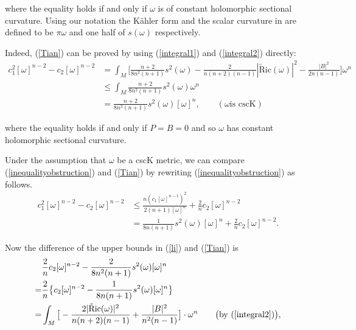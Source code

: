 \documentclass[11pt]{amsart}
\theoremstyle{definition}
\theoremstyle{remark}
\numberwithin{equation}{section}
\begin{document}
where the equality holds if and only if $\omega$ is of constant
holomorphic sectional curvature. Using our notation the K\"{a}hler
form and the scalar curvature in \cite{Ti} are defined to be
$\pi\omega$ and one half of $s(\omega)$ respectively.

Indeed, (\ref{Tian}) can be proved by using (\ref{integral1}) and
(\ref{integral2}) directly:
\begin{equation}\begin{split}
c_1^2[\omega]^{n-2}-c_2[\omega]^{n-2}&=\int_M\big[\frac{n+2}
{8n^2(n+1)}s^2(\omega)-\frac{2 }{n(n+2)(n-1)}|\tilde{\text{R}}
\text{ic}(\omega)|^2-\frac{|B|^2}{2n(n-1)}\big]\omega^n\\
&\leq\int_M\frac{n+2}
{8n^2(n+1)}s^2(\omega)\omega^n\\
&=\frac{n+2}{8n^2(n+1)}s^2(\omega)[\omega]^n,\qquad(\text{$\omega$
is cscK})\end{split}\nonumber\end{equation}

where the equality holds if and only if $P=B=0$ and so $\omega$ has
constant holomorphic sectional curvature.

Under the assumption that $\omega$ be a cscK metric, we can compare
(\ref{inequalityobstruction}) and (\ref{Tian}) by rewriting
(\ref{inequalityobstruction}) as follows. \begin{equation}\label{li}\begin{split}
c_1^2[\omega]^{n-2}-c_2[\omega]^{n-2}&\leq\frac{n(c_1[\omega]^{n-1})^2}
{2(n+1)[\omega]^n}+\frac{2}{n}c_2[\omega]^{n-2}\\
&=\frac{1}{8n(n+1)}s^2(\omega)[\omega]^n+\frac{2}{n}c_2[\omega]^{n-2}.\end{split}\end{equation}

Now the difference of the upper bounds in (\ref{li}) and
(\ref{Tian}) is \begin{equation}\begin{split}
&\frac{2}{n}c_2[\omega]^{n-2}-\frac{2}{8n^2(n+1)}s^2(\omega)[\omega]^n\\
=&\frac{2}{n}\big\{c_2[\omega]^{n-2}-\frac{1}{8n(n+1)}s^2(\omega)[\omega]^n\big\}\\
=&\int_M\big[-\frac{2
|\tilde{\text{R}}\text{ic}(\omega)|^2}{n(n+2)(n-1)}+\frac{|B|^2}{n^2(n-1)}\big]\cdot\omega^n\qquad\big(\text{by
(\ref{integral2})}\big),
\end{split}\nonumber\end{equation}
\end{document}
